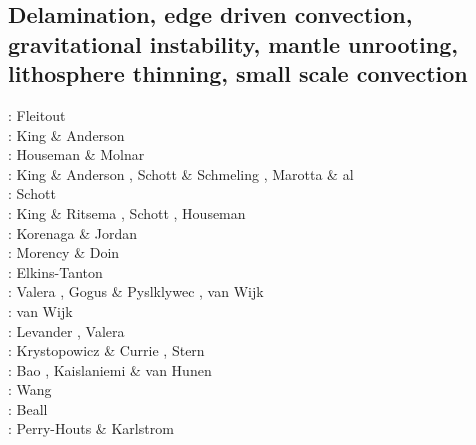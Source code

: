 \subsection{Delamination, edge driven convection, gravitational instability, mantle unrooting, lithosphere thinning, small scale convection} 

\begin{scriptsize}
\nineteeneightysix: Fleitout \etal \cite{flfy86}\\
\nineteenninetyfive: King \& Anderson \cite{kian95}\\
\nineteenninetyseven: Houseman \& Molnar \cite{homo97}\\
\nineteenninetyeight: King \& Anderson \cite{kian98}, Schott \& Schmeling \cite{scsc98}, 
                      Marotta \& al \cite{mafs98}\\
\nineteenninetynine: Schott \etal \cite{scys99} \\
\twothousand: King \& Ritsema \cite{kiri00}, Schott \etal \cite{scys00}, Houseman \etal \cite{honk00}\\
\twothousandthree: Korenaga \& Jordan \cite{kojo03} \\
\twothousandfour: Morency \& Doin \cite{modo04}\\
\twothousandseven: Elkins-Tanton \cite{elki07}\\
\twothousandeight: Valera \etal \cite{vanv08}, Gogus \& Pyslklywec \cite{gopy08}, 
                   van Wijk \etal \cite{vavg08}\\
\twothousandten: van Wijk \etal \cite{vabv10}\\
\twothousandeleven: Levander \etal \cite{lesm11}, Valera \etal \cite{vanj11}\\
\twothousandthirteen: Krystopowicz \& Currie \cite{krcu13}, Stern \etal \cite{sths13}\\
\twothousandfourteen: Bao \etal \cite{baeg14}, Kaislaniemi \& van Hunen \cite{kava14}\\
\twothousandfifteen: Wang \etal \cite{wahz15}\\
\twothousandseventeen: Beall \etal \cite{bems17}\\
\twothousandeighteen: Perry-Houts \& Karlstrom \cite{peka18}
\end{scriptsize}



